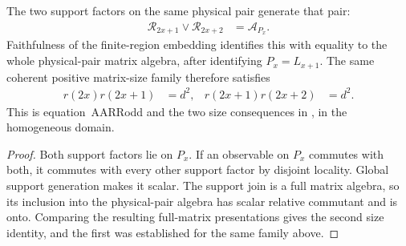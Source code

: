\begin{lemma}
    \label{lem:qca_physical_pair_adjacent_generation}
    \leanok
    The two support factors on the same physical pair generate that pair:
    \begin{align}
        \mathcal R_{2x+1}\vee\mathcal R_{2x+2} & =\mathcal A_{P_x}.
        \label{eq:qca_physical_pair_adjacent_generation}
    \end{align}
    Faithfulness of the finite-region embedding identifies this with
    equality to the whole physical-pair matrix algebra, after identifying
    $P_x=L_{x+1}$. The same coherent positive matrix-size family therefore satisfies
    \begin{align}
        r(2x)r(2x+1) & =d^2, & r(2x+1)r(2x+2) & =d^2.
        \label{eq:qca_both_adjacent_matrix_sizes}
    \end{align}
    This is equation~AARRodd and the two size consequences in
    \cite[lines~1276--1318]{Gross2012IndexTheory}, in the homogeneous domain.
\end{lemma}
\begin{proof}\leanok
    Both support factors lie on $P_x$. If an observable on $P_x$ commutes
    with both, it commutes with every other support factor by disjoint
    locality. Global support generation makes it scalar. The support join
    is a full matrix algebra, so its inclusion into the physical-pair
    algebra has scalar relative commutant and is onto. Comparing the
    resulting full-matrix presentations gives the second size identity,
    and the first was established for the same family above.
\end{proof}

